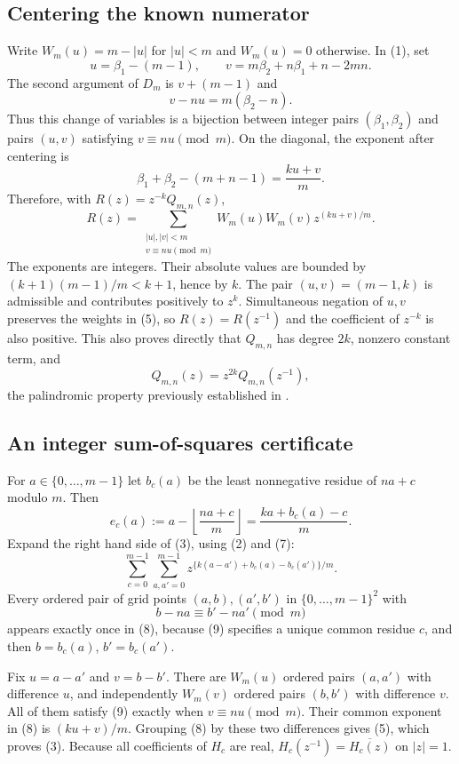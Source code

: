 \documentclass[11pt]{article}
\begin{document}
\subsection*{Centering the known numerator}
Write $W_m(u)=m-|u|$ for $|u|<m$ and $W_m(u)=0$ otherwise. In (1), set
\[
 u=\beta_1-(m-1),\qquad
 v=m\beta_2+n\beta_1+n-2mn.
\]
The second argument of $D_m$ is $v+(m-1)$ and
\[
 v-nu=m(\beta_2-n).
\]
Thus this change of variables is a bijection between integer pairs
$(\beta_1,\beta_2)$ and pairs $(u,v)$ satisfying $v\equiv nu\pmod m$.
On the diagonal, the exponent after centering is
\[
 \beta_1+\beta_2-(m+n-1)=\frac{ku+v}{m}.
\]
Therefore, with $R(z)=z^{-k}Q_{m,n}(z)$,
\[
 R(z)=\sum_{\substack{|u|,|v|<m\\v\equiv nu\pmod m}}
             W_m(u)W_m(v)z^{(ku+v)/m}.                          \tag{5}
\]
The exponents are integers. Their absolute values are bounded by
$(k+1)(m-1)/m<k+1$, hence by $k$. The pair $(u,v)=(m-1,k)$ is
admissible and contributes positively to $z^k$. Simultaneous negation
of $u,v$ preserves the weights in (5), so $R(z)=R(z^{-1})$ and the
coefficient of $z^{-k}$ is also positive. This also proves directly
that $Q_{m,n}$ has degree $2k$, nonzero constant term, and
\[
 Q_{m,n}(z)=z^{2k}Q_{m,n}(z^{-1}),                               \tag{6}
\]
the palindromic property previously established in \cite{EM}.

\subsection*{An integer sum-of-squares certificate}
For $a\in\{0,\ldots,m-1\}$ let $b_c(a)$ be the least nonnegative
residue of $na+c$ modulo $m$. Then
\[
 e_c(a):=a-\left\lfloor\frac{na+c}{m}\right\rfloor
        =\frac{ka+b_c(a)-c}{m}.                                 \tag{7}
\]
Expand the right hand side of (3), using (2) and (7):
\[
 \sum_{c=0}^{m-1}\sum_{a,a'=0}^{m-1}
       z^{\{k(a-a')+b_c(a)-b_c(a')\}/m}.                         \tag{8}
\]
Every ordered pair of grid points $(a,b),(a',b')$ in
$\{0,\ldots,m-1\}^2$ with
\[
 b-na\equiv b'-na'\pmod m                                      \tag{9}
\]
appears exactly once in (8), because (9) specifies a unique common
residue $c$, and then $b=b_c(a)$, $b'=b_c(a')$.

Fix $u=a-a'$ and $v=b-b'$. There are $W_m(u)$ ordered pairs
$(a,a')$ with difference $u$, and independently $W_m(v)$ ordered
pairs $(b,b')$ with difference $v$. All of them satisfy (9) exactly
when $v\equiv nu\pmod m$. Their common exponent in (8) is
$(ku+v)/m$. Grouping (8) by these two differences gives (5),
which proves (3). Because all coefficients of $H_c$ are real,
$H_c(z^{-1})=\overline{H_c(z)}$ on $|z|=1$.
\end{document}
